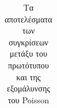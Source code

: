 \begin{table}[H]
\begin{tabular}{ | p{4cm} | p{12cm} | }
		\hline
	\end{tabular}
  \caption{Τα αποτελέσματα των συγκρίσεων μετάξυ του πρωτότυπου και της εξομάλυνσης του Poisson}
  \label{tab:threshold}
\end{table}
